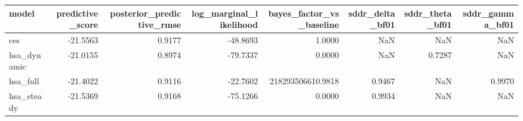 \begin{tabular}{lrrrrrrr}
\toprule
model & predictive\_score & posterior\_predictive\_rmse & log\_marginal\_likelihood & bayes\_factor\_vs\_baseline & sddr\_delta\_bf01 & sddr\_theta\_bf01 & sddr\_gamma\_bf01 \\
\midrule
ces & -21.5563 & 0.9177 & -48.8693 & 1.0000 & NaN & NaN & NaN \\
hsa\_dynamic & -21.0155 & 0.8974 & -79.7337 & 0.0000 & NaN & 0.7287 & NaN \\
hsa\_full & -21.4022 & 0.9116 & -22.7602 & 218293506610.9818 & 0.9467 & NaN & 0.9970 \\
hsa\_steady & -21.5369 & 0.9168 & -75.1266 & 0.0000 & 0.9934 & NaN & NaN \\
\bottomrule
\end{tabular}
